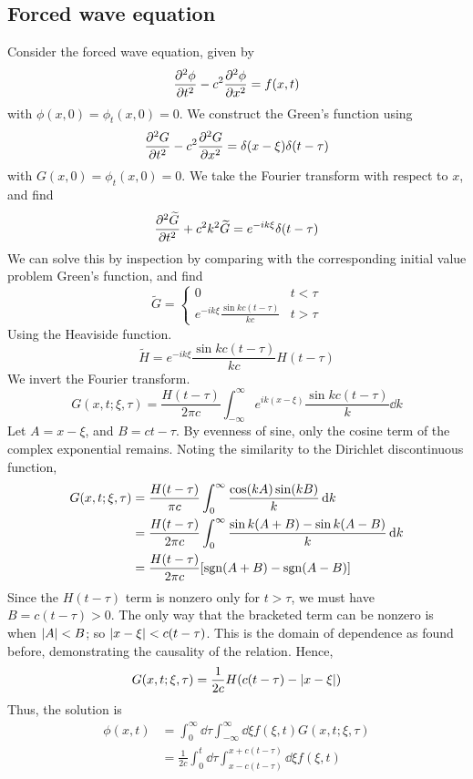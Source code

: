 \subsection{Forced wave equation}
Consider the forced wave equation, given by
\[
	\pdv[2]{\phi}{t} - c^2 \pdv[2]{\phi}{x} = f(x,t)
\]
with \( \phi(x,0) = \phi_t(x,0) = 0 \).
We construct the Green's function using
\[
	\pdv[2]{G}{t} - c^2 \pdv[2]{G}{x} = \delta(x-\xi)\delta(t-\tau)
\]
with \( G(x,0) = \phi_t(x,0) = 0 \).
We take the Fourier transform with respect to \( x \), and find
\[
	\pdv[2]{\widetilde G}{t} + c^2 k^2 \widetilde G = e^{-ik\xi} \delta(t - \tau)
\]
We can solve this by inspection by comparing with the corresponding initial value problem Green's function, and find
\[
	\widetilde G = \begin{cases}
		0                                       & t < \tau \\
		e^{-ik\xi} \frac{\sin kc(t - \tau)}{kc} & t > \tau
	\end{cases}
\]
Using the Heaviside function.
\[
	\widetilde H = e^{-ik\xi} \frac{\sin kc(t - \tau)}{kc} H(t - \tau)
\]
We invert the Fourier transform.
\[
	G(x,t;\xi,\tau) = \frac{H(t-\tau)}{2\pi c} \int_{-\infty}^\infty e^{ik(x - \xi)} \frac{\sin kc(t - \tau)}{k} \dd{k}
\]
Let \( A = x - \xi \), and \( B = ct - \tau \).
By evenness of sine, only the cosine term of the complex exponential remains.
Noting the similarity to the Dirichlet discontinuous function,
\begin{align*}
	G(x,t;\xi,\tau) & = \frac{H(t-\tau)}{\pi c} \int_0^\infty \frac{\cos(kA) \sin(kB)}{k} \dd{k}          \\
	                & = \frac{H(t-\tau)}{2\pi c} \int_0^\infty \frac{\sin k(A+B) - \sin k(A-B)}{k} \dd{k} \\
	                & = \frac{H(t-\tau)}{2\pi c} \qty[ \operatorname{sgn}(A+B) - \operatorname{sgn}(A-B) ]
\end{align*}
Since the \( H(t - \tau) \) term is nonzero only for \( t > \tau \), we must have \( B = c(t-\tau) > 0 \).
The only way that the bracketed term can be nonzero is when \( \abs{A} < B \); so \( \abs{x - \xi} < c(t-\tau) \).
This is the domain of dependence as found before, demonstrating the causality of the relation.
Hence,
\[
	G(x,t;\xi,\tau) = \frac{1}{2c} H(c(t-\tau) - \abs{x - \xi})
\]
Thus, the solution is
\begin{align*}
	\phi(x,t) & = \int_0^\infty \dd{\tau} \int_{-\infty}^\infty \dd{\xi} f(\xi, t) G(x,t;\xi,\tau)          \\
	          & = \frac{1}{2c} \int_0^t \dd{\tau} \int_{x - c(t-\tau)}^{x + c(t - \tau)} \dd{\xi} f(\xi, t)
\end{align*}

